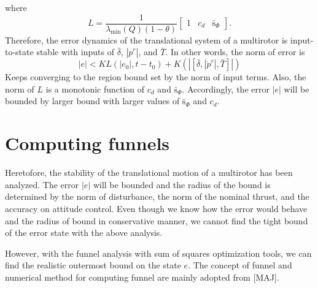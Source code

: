 \documentclass[letterpaper, 10 pt, conference]{ieeeconf}  %
\begin{document}
where
\begin{equation}
L = \frac{1}{\lambda_{\min}(Q)(1-\theta)}\left[
\begin{array}{ccc}
1&c_d&\bar{\text{s}}_\Phi 
\end{array}
\right].
\end{equation}
Therefore, the error dynamics of the translational system of a multirotor is input-to-state stable with inputs of $\bar{\delta}$, $|\dot{p}^r|$, and $\bar{T}$. In other words, the norm of error is 
\begin{equation}
|e| < KL(|e_0|,t-t_0) + K(|[\bar{\delta},|\dot{p}^r|,\bar{T}]|) \nonumber
\end{equation}
Keeps converging to the region bound set by the norm of input terms.
Also, the norm of $L$ is a monotonic function of $c_d$ and $\bar{\text{s}}_\Phi$. 
Accordingly, the error $|e|$ will be bounded by larger bound with larger values of $\bar{\text{s}}_\Phi$ and $c_d$. 

\section{Computing funnels}
Heretofore, the stability of the translational motion of a multirotor has been analyzed. 
The error $|e|$ will be bounded and the radius of the bound is determined by the norm of disturbance, the norm of the nominal thrust, and the accuracy on attitude control. 
Even though we know how the error would behave and the radius of bound in conservative manner, we cannot find the tight bound of the error state with the above analysis. 

However, with the funnel analysis with sum of squares optimization tools, we can find the realistic outermost bound on the state $e$.
The concept of funnel and numerical method for computing funnel are mainly adopted from [MAJ]. 
\end{document}
